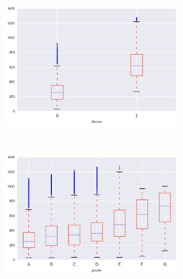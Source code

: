 \begin{anexosenv}
\begin{figure}[t!]
\begin{subfigure}[t]{0.5\textwidth}
            \centerline{\includegraphics[width=1.05\textwidth]{img/installment_by_cluster}}
        \end{subfigure}%
        ~ 
        \begin{subfigure}[t]{0.5\textwidth}
            \centering
   
            \centerline{\includegraphics[width=1.05\textwidth]{img/installment_by_grade}}

        \end{subfigure}



\end{figure}

\begin{figure}[t!]
    \centering
        \caption{term\textunderscore float\textunderscore fee }
        \begin{subfigure}[t]{0.5\textwidth}
            \centering


\end{subfigure}
\end{figure}
\end{anexosenv}
